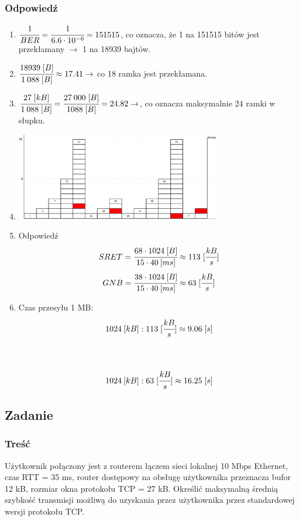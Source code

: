 		\subsubsection{Odpowiedź}
		\begin{enumerate}
			\item $ \cfrac{1}{BER}=\cfrac{1}{6.6\cdot 10^{-6}}=151515$, co oznacza, że 1 na 151515 bitów jest przekłamany $ \rightarrow $ 1 na 18939 bajtów.
			\item $ \cfrac{18939\;[B]}{1\:088\;[B]}\approx17.41 \rightarrow $ co 18 ramka jest przekłamana.
			\item $ \cfrac{27\;[kB]}{1\:088\;[B]}=\cfrac{27\:000\;[B]}{1088\;[B]}=24.82 \rightarrow $, co oznacza maksymalnie 24 ramki w słupku.
			\item
				\begin{center}
					\includegraphics[width=9.0cm]{./images/zadanie14.pdf}
				\end{center}
			\item Odpowiedź
			$$ SRET=\cfrac{68\cdot1024\:[B]}{15\cdot40\:[ms]}\approx113\;[\cfrac{kB}{s}]$$
			$$\\\\ GNB=\cfrac{38\cdot1024\:[B]}{15\cdot40\:[ms]}\approx63\;[\cfrac{kB}{s}]$$
			\item Czas przesyłu 1 MB:\\
			$$ 1024\:[kB] : 113\;[\cfrac{kB}{s}]\approx9.06\;[s] $$\\\\
			$$ 1024\:[kB] : 63\;[\cfrac{kB}{s}]\approx16.25\;[s] $$
		\end{enumerate}
\newpage
	\subsection{Zadanie}
		\subsubsection{Treść}
			Użytkownik połączony jest z routerem łączem sieci lokalnej 10 Mbps Ethernet, czas RTT = 35 ms, router dostępowy na obsługę użytkownika przeznacza bufor 12 kB, rozmiar okna protokołu TCP = 27 kB. Określić maksymalną średnią szybkość transmisji możliwą do uzyskania przez użytkownika przez standardowej wersji protokołu TCP.
